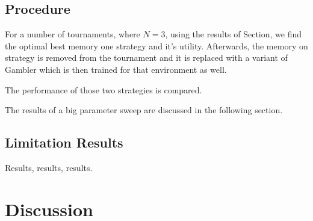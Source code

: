 \documentclass[10pt]{article}
\begin{document}
\subsection{Procedure}

For a number of tournaments, where \(N=3\), using the results of Section, we 
find the optimal best memory one strategy and it's utility. Afterwards, the memory
on strategy is removed from the tournament and it is replaced with a variant of Gambler
which is then trained for that environment as well.

The performance of those two strategies is compared.

The results of a big parameter sweep are discussed in the following section.

\subsection{Limitation Results}

Results, results, results.

\section{Discussion}



\end{document}
